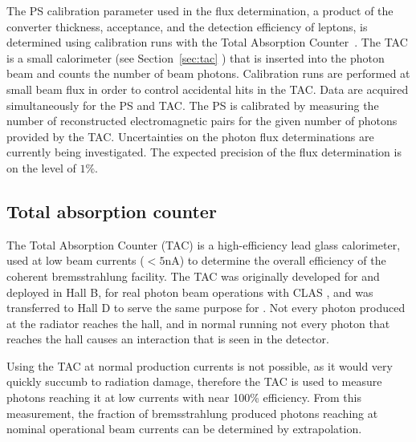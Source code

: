 The PS calibration parameter used in the flux determination, a product of the 
converter thickness, acceptance, and the detection efficiency
of leptons, is determined using calibration runs with the Total 
Absorption Counter~\cite{somov_flux}. The TAC is a small calorimeter (see Section~\ref{sec:tac} ) 
that is inserted into the photon beam and counts the number of beam
photons. Calibration runs are performed at small beam flux in order
to control accidental hits in the TAC. Data are acquired simultaneously for
the PS and TAC. The PS is calibrated by measuring the number of reconstructed
electromagnetic pairs for the given number of photons provided by the TAC. 
Uncertainties on the photon flux determinations are currently being investigated.
The expected precision of the flux determination is on the level of $1\%$.



\subsection{Total absorption counter \label{sec:tac}}
The Total Absorption Counter (TAC) is a high-efficiency lead glass calorimeter, used at low beam currents ($<5$nA) to determine the overall efficiency of the coherent bremsstrahlung facility.
The TAC was originally developed for and deployed in Hall B, for real photon beam operations with CLAS \cite{clasnote1992014, clasnote1993011, clasnote1999002}, and was transferred to Hall D to serve the same purpose for \GX{}.
Not every photon produced at the radiator reaches the hall, and in normal \GX{} running not every photon that reaches the hall causes an interaction that is seen in the \GX{} detector.

Using the TAC at normal \GX{} production currents is not possible, as it would very quickly succumb to radiation damage, therefore the TAC is used to measure photons reaching it at low currents with near 100\% efficiency.
From this measurement, the fraction of bremsstrahlung produced photons reaching \GX{} at nominal operational beam currents can be determined by extrapolation.





